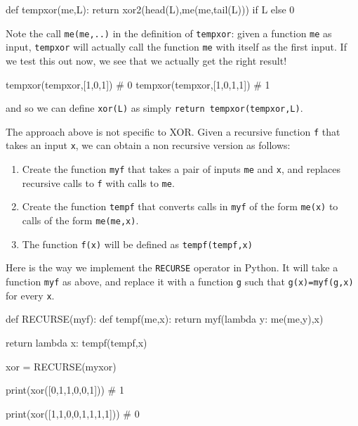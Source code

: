 \begin{code}
def tempxor(me,L): return xor2(head(L),me(me,tail(L))) if L else 0
\end{code}

Note the call \texttt{me(me,..)} in the definition of \texttt{tempxor}:
given a function \texttt{me} as input, \texttt{tempxor} will actually
call the function \texttt{me} with itself as the first input. If we test
this out now, we see that we actually get the right result!

\begin{code}
tempxor(tempxor,[1,0,1])
# 0
tempxor(tempxor,[1,0,1,1])
# 1
\end{code}

and so we can define \texttt{xor(L)} as simply
\texttt{return tempxor(tempxor,L)}.

The approach above is not specific to XOR. Given a recursive function
\texttt{f} that takes an input \texttt{x}, we can obtain a non recursive
version as follows:

\begin{enumerate}
\def\labelenumi{\arabic{enumi}.}
\item
  Create the function \texttt{myf} that takes a pair of inputs
  \texttt{me} and \texttt{x}, and replaces recursive calls to \texttt{f}
  with calls to \texttt{me}.
\item
  Create the function \texttt{tempf} that converts calls in \texttt{myf}
  of the form \texttt{me(x)} to calls of the form \texttt{me(me,x)}.
\item
  The function \texttt{f(x)} will be defined as \texttt{tempf(tempf,x)}
\end{enumerate}

Here is the way we implement the \texttt{RECURSE} operator in Python. It
will take a function \texttt{myf} as above, and replace it with a
function \texttt{g} such that \texttt{g(x)=myf(g,x)} for every
\texttt{x}.

\begin{code}
def RECURSE(myf):
    def tempf(me,x): return myf(lambda y: me(me,y),x)

    return lambda x: tempf(tempf,x)


xor = RECURSE(myxor)

print(xor([0,1,1,0,0,1]))
# 1

print(xor([1,1,0,0,1,1,1,1]))
# 0
\end{code}

